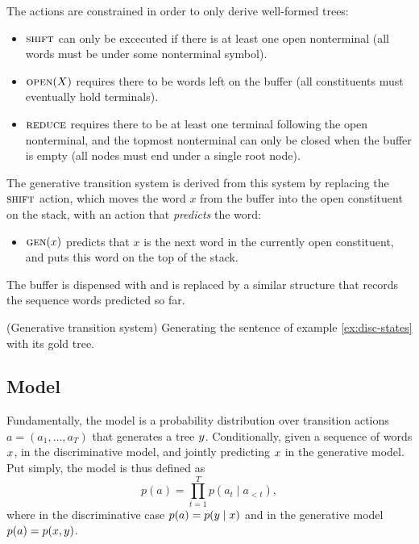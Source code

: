  The actions are constrained in order to only derive well-formed trees:
\begin{itemize}
  \item $\textsc{shift}$ can only be excecuted if there is at least one open nonterminal (all words must be under some nonterminal symbol).
  \item $\textsc{open}(X)$ requires there to be words left on the buffer (all constituents must eventually hold terminals).
  \item $\textsc{reduce}$ requires there to be at least one terminal following the open nonterminal, and the topmost nonterminal can only be closed when the buffer is empty (all nodes must end under a single root node).
\end{itemize}
The generative transition system is derived from this system by replacing the $\textsc{shift}$ action, which moves the word $x$ from the buffer into the open constituent on the stack, with an action that \textit{predicts} the word:
\begin{itemize}
  \item $\textsc{gen}(x)$ predicts that $x$ is the next word in the currently open constituent, and puts this word on the top of the stack.
\end{itemize}
The buffer is dispensed with and is replaced by a similar structure that records the sequence words predicted so far.

\begin{example}{(Generative transition system)} Generating the sentence of example \ref{ex:disc-states} with its gold tree.
  
\end{example}


\subsection{Model}

Fundamentally, the model is a probability distribution over transition actions $a = ( a_1, \dots, a_T )$ that generates a tree $y$. Conditionally, given a sequence of words $x$, in the discriminative model, and jointly predicting $x$ in the generative model. Put simply, the model is thus defined as
\begin{equation}
  \label{eq:naive-rnng-model}
  p( a ) = \prod_{t=1}^T p( a_t \mid a_{<t} ),
\end{equation}
where in the discriminative case $p( a ) = p( y \mid x )$ and in the generative model $p( a ) = p( x, y )$.

